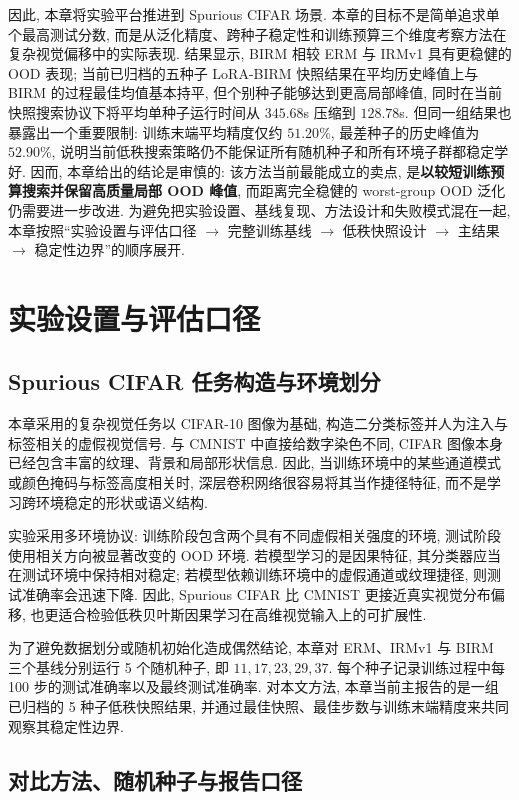 \documentclass[a4paper,punct=banjiao,twoside]{ctexrep}
\theoremstyle{plain}
\theoremstyle{definition}
\theoremstyle{remark}
\begin{document}
因此, 本章将实验平台推进到 Spurious CIFAR 场景. 本章的目标不是简单追求单个最高测试分数, 而是从泛化精度、跨种子稳定性和训练预算三个维度考察方法在复杂视觉偏移中的实际表现. 结果显示, BIRM 相较 ERM 与 IRMv1 具有更稳健的 OOD 表现; 当前已归档的五种子 LoRA-BIRM 快照结果在平均历史峰值上与 BIRM 的过程最佳均值基本持平, 但个别种子能够达到更高局部峰值, 同时在当前快照搜索协议下将平均单种子运行时间从 $345.68$s 压缩到 $128.78$s. 但同一组结果也暴露出一个重要限制: 训练末端平均精度仅约 $51.20\%$, 最差种子的历史峰值为 $52.90\%$, 说明当前低秩搜索策略仍不能保证所有随机种子和所有环境子群都稳定学好. 因而, 本章给出的结论是审慎的: 该方法当前最能成立的卖点, 是\textbf{以较短训练预算搜索并保留高质量局部 OOD 峰值}, 而距离完全稳健的 worst-group OOD 泛化仍需要进一步改进. 为避免把实验设置、基线复现、方法设计和失败模式混在一起, 本章按照“实验设置与评估口径 $\rightarrow$ 完整训练基线 $\rightarrow$ 低秩快照设计 $\rightarrow$ 主结果 $\rightarrow$ 稳定性边界”的顺序展开.

\section{实验设置与评估口径}
\subsection{Spurious CIFAR 任务构造与环境划分}

本章采用的复杂视觉任务以 CIFAR-10 图像为基础, 构造二分类标签并人为注入与标签相关的虚假视觉信号. 与 CMNIST 中直接给数字染色不同, CIFAR 图像本身已经包含丰富的纹理、背景和局部形状信息. 因此, 当训练环境中的某些通道模式或颜色掩码与标签高度相关时, 深层卷积网络很容易将其当作捷径特征, 而不是学习跨环境稳定的形状或语义结构.

实验采用多环境协议: 训练阶段包含两个具有不同虚假相关强度的环境, 测试阶段使用相关方向被显著改变的 OOD 环境. 若模型学习的是因果特征, 其分类器应当在测试环境中保持相对稳定; 若模型依赖训练环境中的虚假通道或纹理捷径, 则测试准确率会迅速下降. 因此, Spurious CIFAR 比 CMNIST 更接近真实视觉分布偏移, 也更适合检验低秩贝叶斯因果学习在高维视觉输入上的可扩展性.

为了避免数据划分或随机初始化造成偶然结论, 本章对 ERM、IRMv1 与 BIRM 三个基线分别运行 5 个随机种子, 即 $11,17,23,29,37$. 每个种子记录训练过程中每 100 步的测试准确率以及最终测试准确率. 对本文方法, 本章当前主报告的是一组已归档的 5 种子低秩快照结果, 并通过最佳快照、最佳步数与训练末端精度来共同观察其稳定性边界.

\subsection{对比方法、随机种子与报告口径}
\end{document}
